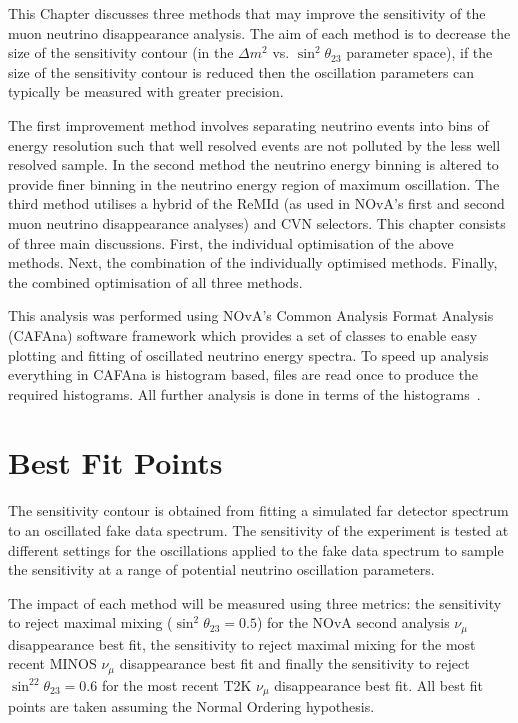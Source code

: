 

This Chapter discusses three methods that may improve the
sensitivity of the muon neutrino disappearance analysis.
The aim of each method is to decrease the size of the sensitivity
contour (in the $\Delta m^2$ vs. $\sin^2\theta_{23}$ parameter space),
if the size of the sensitivity contour is reduced then the oscillation
parameters can typically be measured with greater precision.

The first improvement method involves separating neutrino events into
bins of energy resolution such that well resolved events are not
polluted by the less well resolved sample. 
In the second method the neutrino energy binning is altered to provide
finer binning in the neutrino energy region of maximum
oscillation. 
The third method utilises a hybrid of the ReMId
(as used in NOvA's first and second muon neutrino disappearance
analyses) and CVN selectors.
This chapter consists of three main discussions.
First, the individual optimisation of the above methods. 
Next, the combination of the individually optimised methods. 
Finally, the combined optimisation of all three methods.

This analysis was performed using NOvA's Common Analysis Format
Analysis (CAFAna) software framework which provides a set of classes
to enable easy plotting and fitting of oscillated neutrino energy
spectra. 
To speed up analysis everything in CAFAna is histogram based, files
are read once to produce the required histograms. All further analysis
is done in terms of the histograms~\cite{CAFAnaNote}. 



\section{Best Fit Points}

The sensitivity contour is obtained from fitting a simulated far
detector spectrum to an oscillated fake data spectrum. 
The sensitivity of the experiment is tested at different settings for
the oscillations applied to the fake data spectrum to sample the
sensitivity at a range of potential neutrino oscillation parameters. 

The impact of each method will be measured using three metrics: the 
sensitivity to reject maximal mixing ($\sin^2\theta_{23} = 0.5$) for
the NOvA second analysis 
$\nu_\mu$ disappearance best fit, the sensitivity to reject maximal
mixing for the most recent MINOS $\nu_\mu$ disappearance best fit and 
finally the sensitivity to reject $\sin^22\theta_{23} = 0.6$ for the most
recent T2K $\nu_\mu$ disappearance best fit. All best fit points are
taken assuming the Normal Ordering hypothesis.

